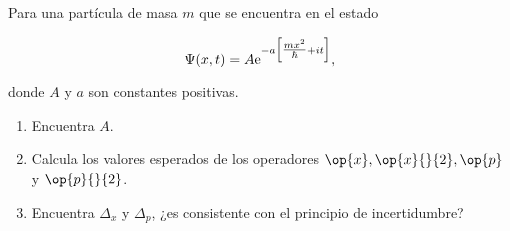 \documentclass[../main.tex]{subfiles}
\begin{document}
\begin{problema}
	Para una partícula de masa \(m\) que se encuentra en el estado

	\begin{equation*}
		\Psi(x, t) = A \mathrm{e}^{-a \Bigl[\tfrac{mx^{2}}{\hbar} + it\Bigr]},
	\end{equation*}

	donde \(A\) y \(a\) son constantes positivas.

	\begin{enumerate}
		\item Encuentra \(A\).
		\item Calcula los valores esperados de los operadores
		      \(\op{x}, \op{x}{}{2}, \op{p}\) y \(\op{p}{}{2}\).
		\item Encuentra \(\Delta_{x}\) y \(\Delta_{p}\), ¿es
		      consistente con el principio de incertidumbre?
	\end{enumerate}
\end{problema}
\end{document}
